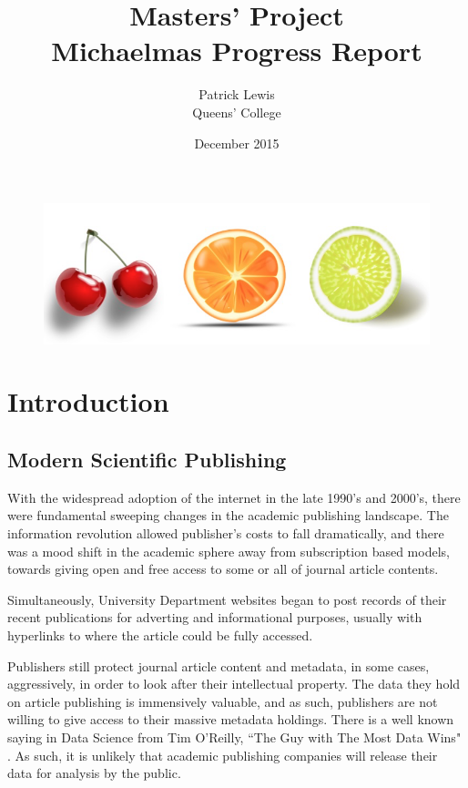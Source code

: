 \documentclass[11pt, oneside]{article}   	%
\title{Masters' Project \\Michaelmas Progress Report}
\author{Patrick Lewis \\Queens' College}
\date{December 2015}							%
\begin{document}
\maketitle
\begin{figure}[H]
    \centering
    \includegraphics[scale=0.5]{TITLE.png}
\end{figure}
\section{Introduction}
\subsection{Modern Scientific Publishing}
With the widespread adoption of the internet in the late 1990's and 2000's, there were fundamental sweeping changes in the academic publishing landscape. The information revolution allowed publisher's costs to fall dramatically, and there was a mood shift in the academic sphere away from subscription based models, towards giving open and free access to some or all of journal article contents.

Simultaneously, University Department websites began to post records of their recent publications for adverting and informational purposes, usually with hyperlinks to where the article could be fully accessed.

Publishers still protect journal article content and metadata, in some cases, aggressively, in order to look after their intellectual property. The data they hold on article publishing is immensively valuable, and as such, publishers are not willing to give access to their massive metadata holdings. There is a well known saying in Data Science from Tim O'Reilly, ``The Guy with The Most Data Wins" \cite{HEWHOHASDATA}. As such, it is unlikely that academic publishing companies will release their data for analysis by the public.
\end{document}
